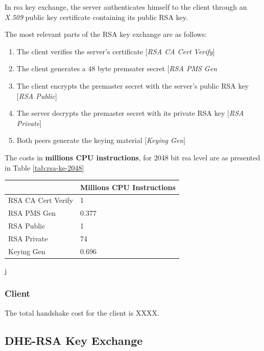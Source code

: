 \documentclass{llncs}
\begin{document}
In \gls{rsa} key exchange, the server authenticates himself to the client through
an \textit{X.509} public key certificate containing its public RSA key.

The most relevant parts of the RSA key exchange are as follows:

\begin{enumerate}
  \item The client verifies the server's certificate [\textit{RSA CA Cert Verify}]
\item The client generates a $48$ byte premsater secret [\textit{RSA PMS Gen}
  \item The client encrypts the premaster secret with the server's public RSA key [\textit{RSA Public}]
  \item The server decrypts the premaster secret with its private RSA key [\textit{RSA Private}]
  \item Both peers generate the keying material [\textit{Keying Gen}]
\end{enumerate}

The costs in \textbf{millions CPU instructions}, for $2048$ bit \gls{rsa} level are as
presented in Table \ref{tab:rsa-ke-2048}

\begin{table}[]
\begin{tabular}{|l|l|}
\hline
                   & Millions CPU Instructions \\ \hline
RSA CA Cert Verify & 1                         \\ \hline
RSA PMS Gen        & 0.377                     \\ \hline
RSA Public         & 1                         \\ \hline
RSA Private        & 74                        \\ \hline
Keying Gen         & 0.696                     \\ \hline
\end{tabular}
\end{table}j

\subsubsection{Client}

The total handshake cost for the client is XXXX.


\subsection{DHE-RSA Key Exchange}
\end{document}
